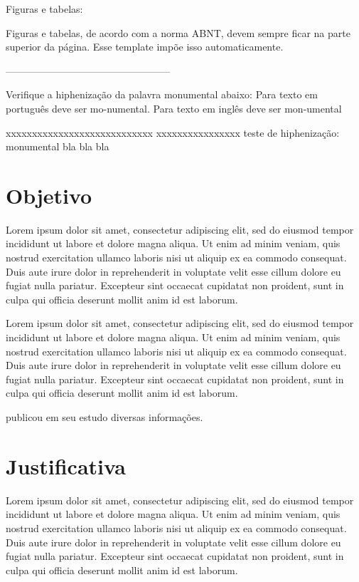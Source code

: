Figuras e tabelas:

Figuras e tabelas, de acordo com a norma ABNT, devem sempre ficar na parte superior da página. Esse template impõe isso automaticamente. 

--------------------------------------------------

Verifique a hiphenização da palavra monumental abaixo: Para texto em português deve ser mo-numental. Para texto em inglês deve ser mon-umental

 xxxxxxxxxxxxxxxxxxxxxxxxxxxx xxxxxxxxxxxxxxxx teste de hiphenização: monumental bla bla bla





\section{Objetivo}

Lorem ipsum dolor sit amet, consectetur adipiscing elit, sed do eiusmod tempor incididunt ut labore et dolore magna aliqua. Ut enim ad minim veniam, quis nostrud exercitation ullamco laboris nisi ut aliquip ex ea commodo consequat. Duis aute irure dolor in reprehenderit in voluptate velit esse cillum dolore eu fugiat nulla pariatur. Excepteur sint occaecat cupidatat non proident, sunt in culpa qui officia deserunt mollit anim id est laborum.

Lorem ipsum dolor sit amet, consectetur adipiscing elit, sed do eiusmod tempor incididunt ut labore et dolore magna aliqua. Ut enim ad minim veniam, quis nostrud exercitation ullamco laboris nisi ut aliquip ex ea commodo consequat. Duis aute irure dolor in reprehenderit in voluptate velit esse cillum dolore eu fugiat nulla pariatur. Excepteur sint occaecat cupidatat non proident, sunt in culpa qui officia deserunt mollit anim id est laborum.

 publicou em seu estudo \cite{wentz:2022} diversas informações.

\section{Justificativa}

Lorem ipsum dolor sit amet, consectetur adipiscing elit, sed do eiusmod tempor incididunt ut labore et dolore magna aliqua. Ut enim ad minim veniam, quis nostrud exercitation ullamco laboris nisi ut aliquip ex ea commodo consequat. Duis aute irure dolor in reprehenderit in voluptate velit esse cillum dolore eu fugiat nulla pariatur. Excepteur sint occaecat cupidatat non proident, sunt in culpa qui officia deserunt mollit anim id est laborum.

